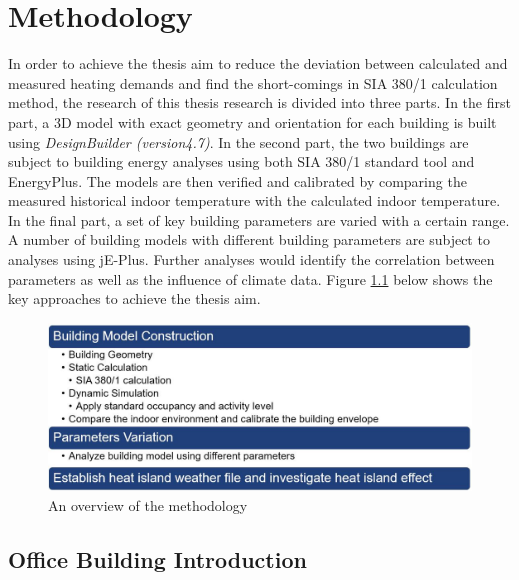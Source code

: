 \documentclass[a4paper, oneside]{discothesis}
\begin{document}
\chapter{Methodology}
	In order to achieve the thesis aim to reduce the deviation between calculated and measured heating demands and find the short-comings in SIA 380/1 calculation method, the research of this thesis research is divided into three parts. In the first part, a 3D model with exact geometry and orientation for each building is built using \textit{DesignBuilder (version4.7)}. In the second part, the two buildings are subject to building energy analyses using both SIA 380/1 standard tool and EnergyPlus. The models are then verified and calibrated by comparing the measured historical indoor temperature with the calculated indoor temperature. In the final part, a set of key building parameters are varied with a certain range. A number of building models with different building parameters are subject to analyses using jE-Plus. Further analyses would identify the correlation between parameters as well as the influence of climate data. Figure \ref{fig:overview} below shows the key approaches to achieve the thesis aim.\\

		\begin{figure}[ht]
		\centering
		\includegraphics[scale=0.5]{overview.JPG}
		\caption{An overview of the methodology}
		\label{fig:overview}
		\end{figure}

	\section{Office Building Introduction}
		
\end{document}
